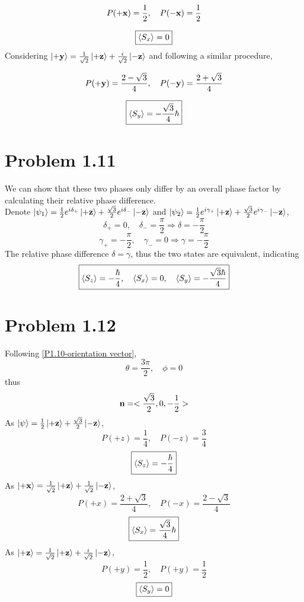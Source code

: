 \documentclass{article}
\begin{document}
\begin{equation*}
    P(\vb{+x}) = \frac{1}{2}, \quad
    P(\vb{-x}) = \frac{1}{2}
\end{equation*}

\begin{equation*}
    \boxed{
    \expval{S_x}=0}
\end{equation*}
Considering $\ket{\vb{+y}} = \frac{1}{\sqrt{2}} \ket{\vb{+z}} + \frac{i}{\sqrt{2}} \ket{\vb{-z}}$ and following a similar procedure,

\begin{equation*}
    P(\vb{+y}) = \frac{2-\sqrt{3}}{4}, \quad
    P(\vb{-y}) = \frac{2+\sqrt{3}}{4}
\end{equation*}

\begin{equation*}
    \boxed{
    \expval{S_y} =-\frac{\sqrt{3}}{4} \hbar}
\end{equation*}

\section*{Problem 1.11}
We can show that these two phases only differ by an overall phase factor by calculating their relative phase difference.\\
Denote $\ket{\psi_1}=\frac{1}{2}e^{i\delta_+ }\ket{\vb{+z}}+\frac{\sqrt{3}}{2}e^{i\delta_-}\ket{\vb{-z}}$ and $\ket{\psi_2}=\frac{1}{2}e^{i\gamma_+ }\ket{\vb{+z}}+\frac{\sqrt{3}}{2}e^{i\gamma_-}\ket{\vb{-z}}$,
\[
    \delta_+ = 0, \quad \delta_- = \frac{\pi}{2}
    \Rightarrow \delta = -\frac{\pi}{2}  
\]
\[
    \gamma_+ = -\frac{\pi}{2}, \quad \gamma_- = 0
    \Rightarrow \gamma = -\frac{\pi}{2}
\]
The relative phase difference $\delta=\gamma$, thus the two states are equivalent, indicating
\begin{equation*}
    \boxed{
        \expval{S_z} = -\frac{\hbar}{4}, \quad
        \expval{S_x} = 0, \quad
        \expval{S_y} = -\frac{\sqrt{3}\hbar}{4}
    }
\end{equation*}
\section*{Problem 1.12}
Following \eqref{P1.10-orientation vector},
\[
    \theta= \frac{3\pi}{2}, \quad
    \phi = 0
\]
thus
\[
    \vb{n}=
    <\frac{\sqrt{3}}{2},0,-\frac{1}{2}>
\]
As $\ket{\psi}=\frac{1}{2}\ket{\vb{+z}} + \frac{\sqrt{3}}{2} \ket{\vb{-z}}$,
\[
    P(+z) = \frac{1}{4}, \quad P(-z) = \frac{3}{4}
\] 
\[
    \boxed{
    \expval{S_z} = -\frac{\hbar}{4}}
\]
As $\ket{\vb{+x}} = \frac{1}{\sqrt{2}} \ket{\vb{+z}} + \frac{1}{\sqrt{2}} \ket{\vb{-z}} $,
\[
    P(+x) = \frac{2+\sqrt{3}}{4}, \quad
    P(-x) = \frac{2-\sqrt{3}}{4}
\]
\[
    \boxed{
    \expval{S_x} = \frac{\sqrt{3}}{4}\hbar}
\]
As $\ket{\vb{+z}} = \frac{1}{\sqrt{2}} \ket{\vb{+z}} + \frac{i}{\sqrt{2}} \ket{\vb{-z}} $,
\[
    P(+y) = \frac{1}{2}, \quad
    P(+y) = \frac{1}{2}
\]
\[
    \boxed{
        \expval{S_y} = 0
    }
\]
\end{document}
